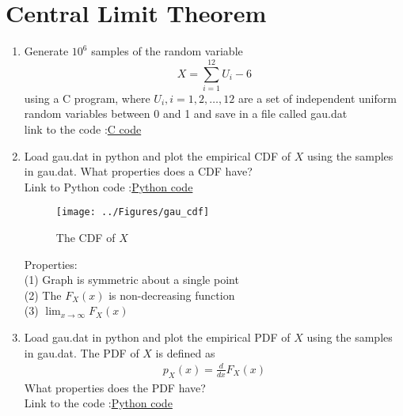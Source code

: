 \documentclass[journal,12pt,twocolumn]{IEEEtran}
\renewcommand\thesection{\arabic{section}}
\begin{document}
\section{Central Limit Theorem}
%
\begin{enumerate}[label=\thesection.\arabic*
,ref=\thesection.\theenumi]



\item
Generate $10^6$ samples of the random variable
\begin{equation}
X = \sum_{i=1}^{12}U_i -6
\end{equation}
using a C program, where $U_i, i = 1,2,\dots, 12$ are  a set of independent uniform random variables between 0 and 1
and save in a file called gau.dat\\
\solution  link to the code :\href{https://github.com/anikettsatpute/Probability-and-Random-Variable-Assignment/blob/main/code/code2_1.c}{C code}
\vspace{0.2in}

\item
Load gau.dat in python and plot the empirical CDF of $X$ using the samples in gau.dat. What properties does a CDF have?
\\
\solution Link to Python code :\href{https://github.com/anikettsatpute/Probability-and-Random-Variable-Assignment/blob/main/code/code2_2.py}{Python code}

\begin{figure}[h]
\centering
\texttt{[image: ../Figures/gau\_cdf]}
\caption{The CDF of $X$}
\label{fig:gau_cdf}
\end{figure}

Properties:\\
(1)  Graph is symmetric about a single point\\
(2)	 The $F_X(x)$ is non-decreasing function\\
(3)	 $\lim_{x \to \infty} F_X(x)$
\vspace{0.2in}

\item
Load gau.dat in python and plot the empirical PDF of $X$ using the samples in gau.dat. The PDF of $X$ is defined as
\begin{align}
p_{X}(x) = \frac{d}{dx}F_{X}(x)
\end{align}
What properties does the PDF have?
\\
\solution Link to the code :\href{https://github.com/anikettsatpute/Probability-and-Random-Variable-Assignment/blob/main/code/code2_3.py}{Python code}


\end{enumerate}
\end{document}

